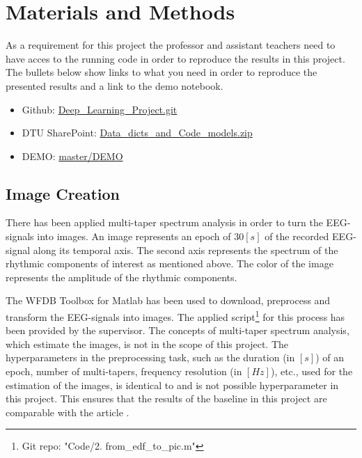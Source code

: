 \section{Materials and Methods}
\label{sec:materials_and_methods}

 As a requirement for this project the professor and assistant teachers need to have acces to the running code in order to reproduce the results in this project. 
 The bullets below show links to what you need in order to reproduce the presented results and a link to the demo notebook.
 \begin{itemize}
 	\item Github: \href{https://github.com/anderslaunerbaek/Deep\_Learning\_Project.git}{Deep\_Learning\_Project.git}
 	\item DTU SharePoint: \href{https://dtudk-my.sharepoint.com/personal/s160159\_win\_dtu\_dk/\_layouts/15/guestaccess.aspx?docid=093aa4dcaee0b4e3aa18b0ee67061a678&authkey=AbdnyuYwQUWn0BDEPeDn1Mg&e=b79a063cd72d43a9b7db88f8b8fd1b06}{Data\_dicts\_and\_Code\_models.zip}
 	\item DEMO: \href{https://github.com/anderslaunerbaek/Deep_Learning_Project/tree/master/DEMO}{master/DEMO}
 \end{itemize}

\subsection{Image Creation}
There has been applied multi-taper spectrum analysis in order to turn the EEG-signals into images. An image represents an epoch of $30\left[s \right]$ of the recorded EEG-signal along its temporal axis. The second axis represents the spectrum of the rhythmic components of interest as mentioned above. The color of the image represents the amplitude of the rhythmic components.

The WFDB Toolbox \cite{matlab} for Matlab has been used to download, preprocess and transform the EEG-signals into images. The applied script\footnote{Git repo: "Code/2. from\_edf\_to\_pic.m"} for this process has been provided by the supervisor. 
The concepts of multi-taper spectrum analysis, which estimate the images, is not in the scope of this project. The hyperparameters in the preprocessing task, such as the duration (in $\left[s \right]$) of an epoch, number of multi-tapers, frequency resolution (in $\left[Hz \right]$), etc., used for the estimation of the images, is identical to \cite{main_ar} and is not possible hyperparameter in this project. This ensures that the results of the baseline in this project are comparable with the article \cite{main_ar}. 

